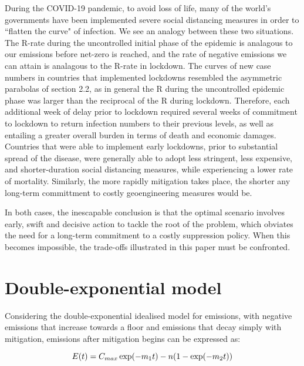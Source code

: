 \documentclass[draft]{agujournal2019}
\begin{document}
\medskip

During the COVID-19 pandemic, to avoid loss of life, many of the world's governments have been implemented severe social distancing measures in order to ``flatten the curve" of infection. We see an analogy between these two situations. The R-rate during the uncontrolled initial phase of the epidemic is analagous to our emissions before net-zero is reached, and the rate of negative emissions we can attain is analagous to the R-rate in lockdown. The curves of new case numbers in countries that implemented lockdowns resembled the asymmetric parabolas of section 2.2, as in general the R during the uncontrolled epidemic phase was larger than the reciprocal of the R during lockdown. Therefore, each additional week of delay prior to lockdown required several weeks of commitment to lockdown to return infection numbers to their previous levels, as well as entailing a greater overall burden in terms of death and economic damages. Countries that were able to implement early lockdowns, prior to substantial spread of the disease, were generally able to adopt less stringent, less expensive, and shorter-duration social distancing measures, while experiencing a lower rate of mortality. Similarly, the more rapidly mitigation takes place, the shorter any long-term committment to costly geoengineering measures would be.

\medskip

In both cases, the inescapable conclusion is that the optimal scenario involves early, swift and decisive action to tackle the root of the problem, which obviates the need for a long-term commitment to a costly suppression policy. When this becomes impossible, the trade-offs illustrated in this paper must be confronted. 

 

\newpage

\appendix


\section{Double-exponential model}

Considering the double-exponential idealised model for emissions, with negative emissions that increase towards a floor and emissions that decay simply with mitigation, emissions after mitigation begins can be expressed as:

\begin{equation}
E(t) =  C_{max} \exp(-  m\textsubscript{1} t) - n ( 1 - \exp( - m\textsubscript{2} t)) 
\end{equation}
\end{document}
